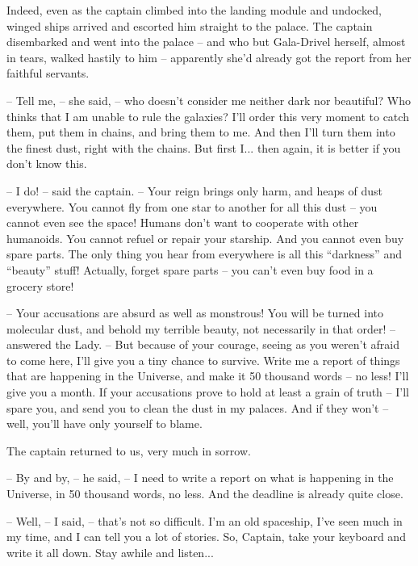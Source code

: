 \documentclass[ebook,oneside,final,openright]{memoir}
\begin{document}
\par
Indeed, even as the captain climbed into the landing module and undocked, winged ships arrived and escorted him straight to the palace. The captain disembarked and went into the palace – and who but Gala-Drivel herself, almost in tears, walked hastily to him – apparently she’d already got the report from her faithful servants.\par
– Tell me, – she said, – who doesn’t consider me neither dark nor beautiful? Who thinks that I am unable to rule the galaxies? I’ll order this very moment to catch them, put them in chains, and bring them to me. And then I’ll turn them into the finest dust, right with the chains. But first I... then again, it is better if you don’t know this.\par
– I do! – said the captain. – Your reign brings only harm, and heaps of dust everywhere. You cannot fly from one star to another for all this dust – you cannot even see the space! Humans don’t want to cooperate with other humanoids. You cannot refuel or repair your starship. And you cannot even buy spare parts. The only thing you hear from everywhere is all this “darkness” and “beauty” stuff! Actually, forget spare parts – you can’t even buy food in a grocery store!\par
– Your accusations are absurd as well as monstrous! You will be turned into molecular dust, and behold my terrible beauty, not necessarily in that order! – answered the Lady. – But because of your courage, seeing as you weren’t afraid to come here, I’ll give you a tiny chance to survive. Write me a report of things that are happening in the Universe, and make it 50 thousand words – no less! I’ll give you a month. If your accusations prove to hold at least a grain of truth – I’ll spare you, and send you to clean the dust in my palaces. And if they won’t – well, you’ll have only yourself to blame.\par
\par
The captain returned to us, very much in sorrow.\par
– By and by, – he said, – I need to write a report on what is happening in the Universe, in 50 thousand words, no less. And the deadline is already quite close.\par
– Well, – I said, – that’s not so difficult. I’m an old spaceship, I’ve seen much in my time, and I can tell you a lot of stories. So, Captain, take your keyboard and write it all down. Stay awhile and listen...
\end{document}
